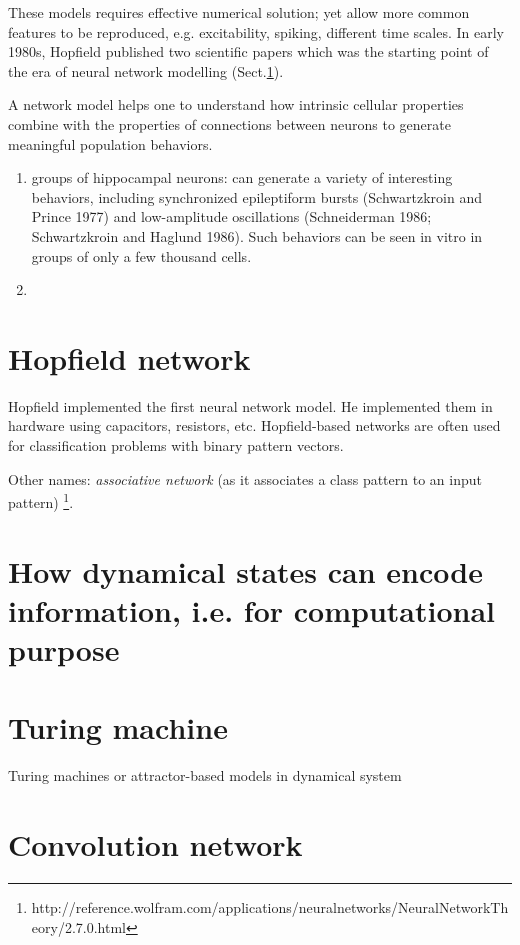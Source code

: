 These models requires effective numerical solution; yet allow more common
features to be reproduced, e.g. excitability, spiking, different time scales.
In early 1980s, Hopfield published two  scientific papers which was the starting
point of the era of neural network modelling
(Sect.\ref{sec:Hopfield-neural-network}). 

A network model helps one to understand how intrinsic cellular properties
combine with the properties of connections between neurons to generate
meaningful population behaviors.
\begin{enumerate}
  
  \item groups of hippocampal neurons: can generate a variety of interesting
behaviors, including synchronized epileptiform bursts (Schwartzkroin and Prince
1977) and low-amplitude oscillations (Schneiderman 1986; Schwartzkroin and
Haglund 1986). Such behaviors can be seen in vitro in groups of only a few
thousand cells.

  \item 
\end{enumerate}

\section{Hopfield network}
\label{sec:Hopfield-neural-network}


Hopfield implemented the first neural network model. He implemented them in
hardware using capacitors, resistors, etc. Hopfield-based networks are often
used for classification problems with binary pattern vectors. 

Other names: {\it associative network} (as it associates a class pattern to an
input pattern)
\footnote{http://reference.wolfram.com/applications/neuralnetworks/NeuralNetworkTheory/2.7.0.html}.


\section{How dynamical states can encode information, i.e. for computational
purpose}


\section{Turing machine}

Turing machines or attractor-based models in dynamical system

\section{Convolution network}

